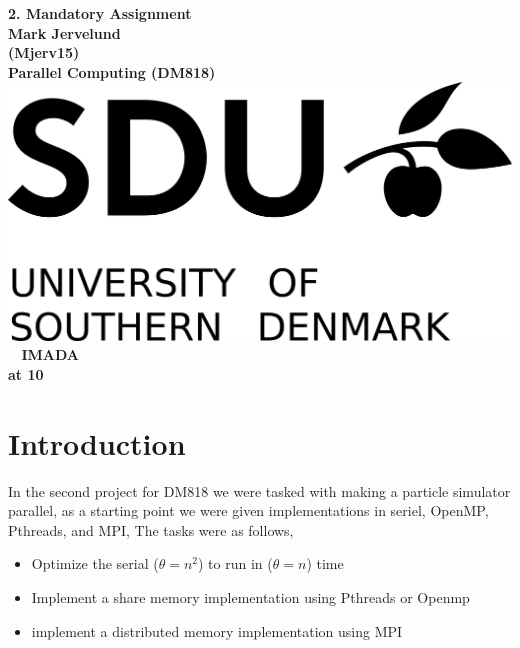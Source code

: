 \documentclass[a4paper,10pt,titlepage]{report}
\date{}
\begin{document}
\begin{titlepage}
\centering
    \vspace*{9\baselineskip}
    \huge
    \bfseries
    2. Mandatory Assignment \\
    \normalfont
    Mark Jervelund  \\
    (Mjerv15) \\
	\huge
    Parallel Computing (DM818)  \\[4\baselineskip]
    \normalfont
	\includegraphics[scale=1]{SDU_logo}
    \vfill\
    \vspace{5mm}
    IMADA \\

    \textbf{\datedate}  \bf{at 10} \\[2\baselineskip]
\end{titlepage}

\renewcommand{\thepage}{\roman{page}}%
\tableofcontents
\newpage
\setcounter{page}{1}
\renewcommand{\thepage}{\arabic{page}}


\section{Introduction}

In the second project for DM818 we were tasked with making a particle simulator parallel, as a starting point we were given implementations in seriel, OpenMP, Pthreads, and MPI, The tasks were as follows, \\

\begin{itemize}
\item Optimize the serial ($ \theta = n^2$) to run in ($ \theta = n$) time
\item Implement a share memory implementation using Pthreads or Openmp
\item implement a distributed memory implementation using MPI
\end{itemize}
\end{document}
